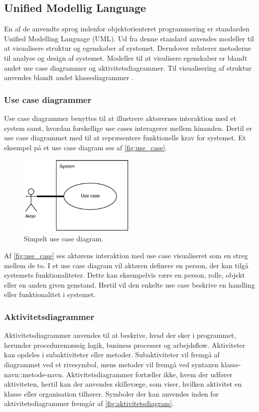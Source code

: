 \subsection{Unified Modellig Language}
En af de anvendte sprog indenfor objektorienteret programmering er standarden Unified Modelling Language (UML). Ud fra denne standard anvendes modeller til at visualisere struktur og egenskaber af systemet. Derudover relaterer metoderne til analyse og design af systemet. Modeller til at visulisere egenskaber er blandt andet use case diagrammer og aktivitetsdiagrammer. Til visualisering af struktur anvendes blandt andet klassediagrammer \cite{Fowler2004, Williams2004}.


\subsubsection{Use case diagrammer} 
Use case diagrammer benyttes til at illustrere aktørernes interaktion med et system samt, hvordan forskellige use cases interagerer mellem hinanden. Dertil er use case diagrammet med til at repræsentere funktionelle krav for systemet. \cite{Williams2004} Et eksempel på et use case diagram ses af \autoref{fig:use_case}.

\begin{figure} [H]
\centering
\includegraphics[width=0.5\textwidth]{figures/USE_CASE2}
\caption{Simpelt use case diagram.}
\label{fig:use_case}
\end{figure}

\noindent
Af \autoref{fig:use_case} ses aktørens interaktion med use case visualiseret som en streg mellem de to. I et use case diagram vil aktøren definere en person, der kan tilgå systemets funktionaliteter. Dette kan eksempelvis være en person, rolle, objekt eller en anden given genstand. Hertil vil den enkelte use case beskrive en handling eller funktionalitet i systemet.\cite{Fowler2004, Williams2004}


\subsubsection{Aktivitetsdiagrammer} 
Aktivitetsdiagrammer anvendes til at beskrive, hvad der sker i programmet, herunder proceduremæssig logik, business processer og arbejdsflow. Aktiviteter kan opdeles i subaktiviteter eller metoder. Subaktiviteter vil fremgå af diagrammet ved et rivesymbol, mens metoder vil fremgå ved syntaxen klasse-navn::metode-navn. Aktivitetsdiagrammer fortæller ikke, hvem der udfører aktiviteten, hertil kan der anvendes skillevæge, som viser, hvilken aktivitet en klasse eller organisation tilhører. Symboler der kan anvendes inden for aktivitetsdiagrammer fremgår af \autoref{fig:aktivitetsdiagram}.

